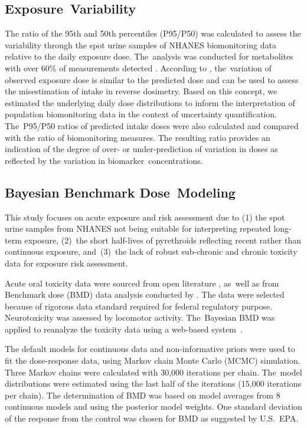 \documentclass[toxics,article,accept,pdftex,moreauthors]{Definitions/mdpi}
\begin{document}
\subsection{Exposure~Variability}\label{exposure-variability}

The ratio of the 95th and 50th percentiles (P95/P50) was calculated to
assess the variability through the spot urine samples of NHANES
biomonitoring data relative to the daily exposure dose. The~analysis was
conducted for metabolites with over 60\% of measurements detected
\citep{faure_evaluation_2020}. According to
\citet{aylward_interpreting_2012}, the~variation of observed exposure
dose is similar to the predicted dose and can be used to assess the
misestimation of intake in reverse dosimetry. Based on this concept, we
estimated the underlying daily dose distributions to inform the
interpretation of population biomonitoring data in the context of
uncertainty quantification. The~P95/P50 ratios of predicted intake doses were
also calculated and compared with the ratio of biomonitoring measures.
The resulting ratio provides an indication of the degree of over- or
under-prediction of variation in doses as reflected by the variation in
biomarker~concentrations.

\subsection{Bayesian Benchmark Dose~Modeling}\label{bayesian-benchmark-dose-modeling} %

This study focuses on acute exposure and risk assessment due to (1) the
spot urine samples from NHANES not being suitable for interpreting
repeated long-term exposure, (2)~the short half-lives of pyrethroids
reflecting recent rather than continuous exposure, and~(3)~the lack of
robust sub-chronic and chronic toxicity data for exposure risk
assessment.

Acute oral toxicity data were sourced from open literature
\citep{wolansky_relative_2006}, as~well as from Benchmark dose (BMD)
data analysis conducted by \citet{us2018der}.
The data were selected because of rigorous data standard required for
federal regulatory purpose. Neurotoxicity was assessed by locomotor
activity. The~Bayesian BMD was applied to reanalyze the toxicity data
using a web-based system~\citep{shao_kan_web_2018}.

The default models for continuous data and non-informative priors were
used to fit the dose-response data, using Markov chain Monte Carlo
(MCMC) simulation. Three Markov chains were calculated with 30,000
iterations per chain. The~model distributions were estimated using the
last half of the iterations (15,000 iterations per chain). 
The determination of BMD was based on model averages from 8 continuous models and using the posterior model weights. 
One standard deviation of the response from the control was chosen for BMD as suggested by U.S.~EPA.
\end{document}
